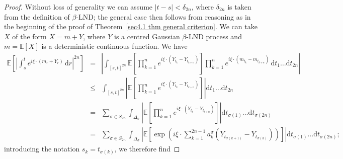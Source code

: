 \documentclass[10pt]{article}
\newcommand{\mathd}{\mathrm{d}}
\begin{document}
\begin{proof}
  Without loss of generality we can assume $| t - s | < \delta_{2 n}$, where
  $\delta_{2 n}$ is taken from the definition of $\beta$\mbox{-}LND; the
  general case then follows from reasoning as in the beginning of the proof of
  Theorem~\ref{sec4.1 thm general criterion}. We can take $X$ of the form $X =
  m + Y$, where $Y$ is a centred Gaussian $\beta$\mbox{-}LND process and $m
  =\mathbb{E} [X]$ is a deterministic continuous function. We have
  \begin{eqnarray*}
    \mathbb{E} \left[ \left| \int_s^t e^{i \xi \cdot (m_r + Y_r)} \, \mathd r
    \right|^{2 n} \right] & = & \left| \int_{[s, t]^{2 n}} \mathbb{E} \left[
    \prod_{k = 1}^n e^{i \xi \cdot (Y_{t_k} - Y_{t_{k + n}})} \right] \prod_{k
    = 1}^n e^{i \xi \cdot (m_{t_k} - m_{t_{k + n}})} \, \mathd t_1 \ldots
    \mathd t_{2 n} \right|\\
    & \leqslant & \int_{[s, t]^{2 n}} \left| \mathbb{E} \left[ \prod_{k =
    1}^n e^{i \xi \cdot (Y_{t_k} - Y_{t_{k + n}})} \right] \right| \mathd t_1
    \ldots \mathd t_{2 n}\\
    & = & \sum_{\sigma \in S_{2 n}} \int_{\Delta_{\sigma}} \left| \mathbb{E}
    \left[ \prod_{k = 1}^n e^{i \xi \cdot (Y_{t_k} - Y_{t_{k + n}})} \right]
    \right| \mathd t_{\sigma (1)} \ldots \mathd t_{\sigma (2 n)}\\
    & = & \sum_{\sigma \in S_{2 n}} \int_{\Delta_{\sigma}} \left| \mathbb{E}
    \left[ \exp \left( i \xi \cdot \sum_{k = 1}^{2 n - 1} a_k^{\sigma}
    (Y_{t_{\sigma (k + 1)}} - Y_{t_{\sigma (k)}}) \right) \right] \right|
    \mathd t_{\sigma (1)} \ldots \mathd t_{\sigma (2 n)} ;
  \end{eqnarray*}
  introducing the notation $s_k = t_{\sigma (k)}$, we therefore find
  

\end{proof}
\end{document}
